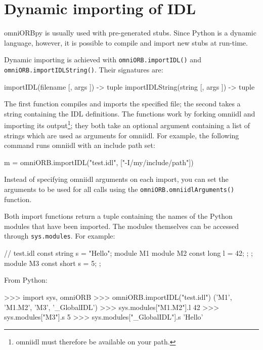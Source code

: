 \documentclass[draft,11pt,twoside,a4paper]{book}
\newcommand{\code}[1]{\texttt{#1}}
\newcommand{\op}[1]{\texttt{#1()}}
\newcommand{\dsc}{\discretionary{}{}{}}
\begin{document}
\section{Dynamic importing of IDL}
\label{sec:importIDL}

omniORBpy is usually used with pre-generated stubs. Since Python is a
dynamic language, however, it is possible to compile and import new
stubs at run-time.

Dynamic importing is achieved with \op{omniORB.importIDL} and
\op{omniORB.\dsc{}importIDLString}. Their signatures are:

\begin{pylisting}
importIDL(filename [, args ]) -> tuple
importIDLString(string [, args ]) -> tuple
\end{pylisting}

The first function compiles and imports the specified file; the second
takes a string containing the IDL definitions. The functions work by
forking omniidl and importing its output\footnote{omniidl must
therefore be available on your path.}; they both take an optional
argument containing a list of strings which are used as arguments for
omniidl. For example, the following command runs omniidl with an
include path set:

\begin{pylisting}
m = omniORB.importIDL("test.idl", ["-I/my/include/path"])
\end{pylisting}

\noindent Instead of specifying omniidl arguments on each import, you
can set the arguments to be used for all calls using the
\op{omniORB.omniidlArguments} function.

Both import functions return a tuple containing the names of the
Python modules that have been imported. The modules themselves can be
accessed through \code{sys.modules}. For example:

\begin{idllisting}
// test.idl
const string s = "Hello";
module M1 {
  module M2 {
    const long l = 42;
  };
};
module M3 {
  const short s = 5;
};
\end{idllisting}

\noindent From Python:

\begin{pylisting}
>>> import sys, omniORB
>>> omniORB.importIDL("test.idl")
('M1', 'M1.M2', 'M3', '_GlobalIDL')
>>> sys.modules["M1.M2"].l
42
>>> sys.modules["M3"].s
5
>>> sys.modules["_GlobalIDL"].s
'Hello'
\end{pylisting}
\end{document}
